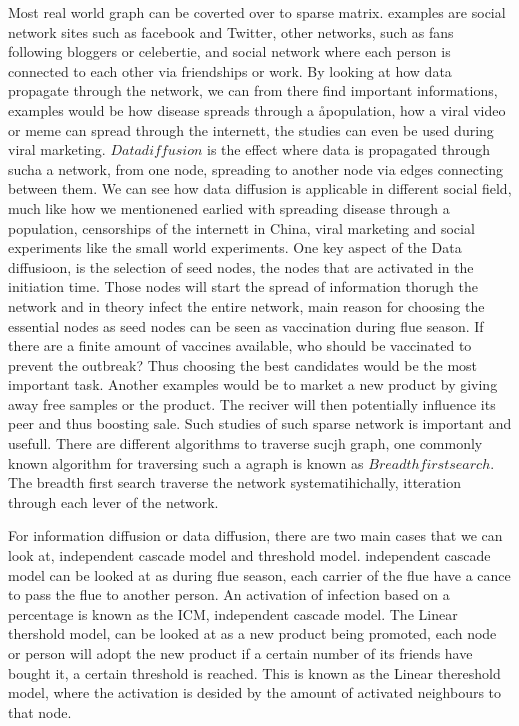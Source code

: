 Most real world graph can be coverted over to sparse matrix. examples are social network sites such as facebook and Twitter, other networks, such as fans following bloggers or celebertie, and social network where each person is connected to each other via friendships or work. By looking at how data propagate through the network, we can from there find important informations, examples would be how disease spreads through a åpopulation, how a viral video or meme can spread through the internett, the studies can even be used during viral marketing. $Data diffusion$ is the effect where data is propagated through sucha a network, from one node, spreading to another node via edges connecting between them. We can see how data diffusion is applicable in different social field, much like how we mentionened earlied with spreading disease through a population, censorships of the internett in China, viral marketing and social experiments like the small world experiments. One key aspect of the Data diffusioon, is the selection of seed nodes, the nodes that are activated in the initiation time. Those nodes will start the spread of information thorugh the network and in theory infect the entire network, main reason for choosing the essential nodes as seed nodes can be seen as vaccination during flue season. If there are a finite amount of vaccines available, who should be vaccinated to prevent the outbreak? Thus choosing the best candidates would be the most important task. Another examples would be to market a new product by giving away free samples or the product. The reciver will then potentially influence its peer and thus boosting sale. Such studies of such sparse network is important and usefull. There are different algorithms to traverse sucjh graph, one commonly known algorithm for traversing such a agraph is known as $Breadth first search$. The breadth first search traverse the network systematihichally, itteration through each lever of the network. 

For information diffusion or data diffusion, there are two main cases that we can look at, independent cascade model and threshold model. independent cascade model can be looked at as during flue season, each carrier of the flue have a cance to pass the flue to another person. An activation of infection based on a percentage is known as the ICM, independent cascade model. The Linear thershold model, can be looked at as a new product being promoted, each node or person will adopt the new product if a certain number of its friends have bought it, a certain threshold is reached. This is known as the Linear thereshold model, where the activation is desided by the amount of activated neighbours to that node. 

